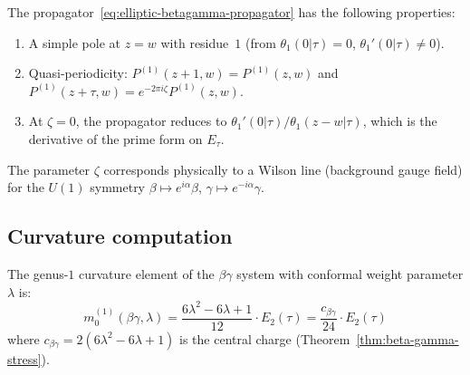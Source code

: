 \begin{remark}
The propagator~\eqref{eq:elliptic-betagamma-propagator} has the
following properties:
\begin{enumerate}
\item A simple pole at $z = w$ with residue~$1$
  (from $\theta_1(0|\tau) = 0$, $\theta_1'(0|\tau) \neq 0$).
\item Quasi-periodicity: $P^{(1)}(z+1,w) = P^{(1)}(z,w)$ and
  $P^{(1)}(z+\tau,w) = e^{-2\pi i \zeta} P^{(1)}(z,w)$.
\item At $\zeta = 0$, the propagator reduces to
  $\theta_1'(0|\tau)/\theta_1(z-w|\tau)$, which is the derivative of
  the prime form on $E_\tau$.
\end{enumerate}
The parameter $\zeta$ corresponds physically to a
Wilson line (background gauge field) for the $U(1)$ symmetry
$\beta \mapsto e^{i\alpha}\beta$,
$\gamma \mapsto e^{-i\alpha}\gamma$.
\end{remark}

\subsection{Curvature computation}

\begin{proposition}
\label{prop:betagamma-genus1-curvature}
The genus-$1$ curvature element of the $\beta\gamma$ system with
conformal weight parameter $\lambda$ is:
\begin{equation}\label{eq:betagamma-genus1-curvature}
m_0^{(1)}(\beta\gamma, \lambda)
= \frac{6\lambda^2 - 6\lambda + 1}{12} \cdot E_2(\tau)
= \frac{c_{\beta\gamma}}{24} \cdot E_2(\tau)
\end{equation}
where $c_{\beta\gamma} = 2(6\lambda^2 - 6\lambda + 1)$ is the
central charge (Theorem~\ref{thm:beta-gamma-stress}).
\end{proposition}

